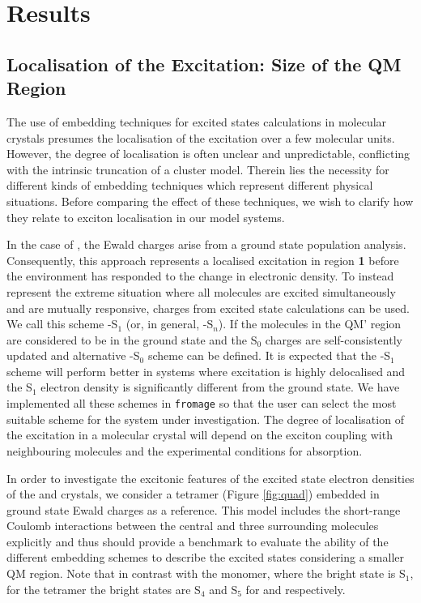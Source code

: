 \section{Results}

\label{sec:results}

\subsection{Localisation of the Excitation: Size of the QM Region} 

\label{sec:loc}
The use of embedding techniques for excited states calculations in molecular crystals presumes the localisation of the excitation over a few molecular units. However, the degree of localisation is often unclear and unpredictable, conflicting with the intrinsic truncation of a cluster model. Therein lies the necessity for different kinds of embedding techniques which represent different physical situations. Before comparing the effect of these techniques, we wish to clarify how they relate to exciton localisation in our model systems.

In the case of \EEC{}, the Ewald charges arise from a ground state population analysis. Consequently, this approach represents a localised excitation in region \textbf{1} before the environment has responded to the change in electronic density. To instead represent the extreme situation where all molecules are excited simultaneously and are mutually responsive, charges from excited state calculations can be used. We call this scheme \SCEEC{}-S$_1$ (or, in general, \SCEEC{}-S$_n$). If the molecules in the QM' region are considered to be in the ground state and the S$_0$ charges are self-consistently updated and alternative \SCEEC{}-S$_0$ scheme can be defined. It is expected that the \SCEEC{}-S$_1$ scheme will perform better in systems where excitation is highly delocalised and the S$_1$ electron density is significantly different from the ground state. We have implemented all these schemes in \texttt{fromage} so that the user can select the most suitable scheme for the system under investigation. The degree of localisation of the excitation in a molecular crystal will depend on the exciton coupling with neighbouring molecules and the experimental conditions for absorption.

In order to investigate the excitonic features of the excited state electron densities of the \HC{} and \HCC{} crystals, we consider a tetramer (Figure \ref{fig:quad}) embedded in ground state Ewald charges as a reference. This model includes the short-range Coulomb interactions between the central and three surrounding molecules explicitly and thus should provide a benchmark to evaluate the ability of the different embedding schemes to describe the excited states considering a smaller QM region. Note that in contrast with the monomer, where the bright state is S$_1$, for the tetramer the bright states are S$_4$ and S$_5$ for \HC{} and \HCC{} respectively.

